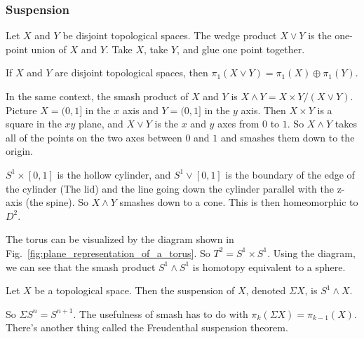 \documentclass[crop=false,class=book,oneside]{standalone}                      %
\begin{document}
            \subsubsection{Suspension}
                Let $X$ and $Y$ be disjoint topological spaces. The wedge
                product $X\vee Y$ is the one-point union of $X$ and $Y$. Take
                $X$, take $Y$, and glue one point together. 
                \begin{theorem}
                    If $X$ and $Y$ are disjoint topological spaces, then
                    $\pi_{1}(X\vee Y)=\pi_{1}(X)\oplus\pi_{1}(Y)$.
                \end{theorem}
                In the same context, the smash product of $X$ and $Y$ is
                $X\wedge Y=X\times Y/(X\vee Y)$. Picture $X=(0,1]$ in the $x$
                axis and $Y=(0,1]$ in the $y$ axis. Then $X\times Y$ is a
                square in the $xy$ plane, and $X\vee Y$ is the $x$ and $y$ axes
                from $0$ to $1$. So $X\wedge Y$ takes all of the points on the
                two axes between $0$ and $1$ and smashes them down to the
                origin.
                \begin{example}
                    $S^{1}\times [0,1]$ is the hollow cylinder, and
                    $S^{1}\vee [0,1]$ is the boundary of the edge of the
                    cylinder (The lid) and the line going down the cylinder
                    parallel with the z-axis (the spine). So $X\wedge Y$
                    smashes down to a cone. This is then homeomorphic
                    to $D^{2}$. 
                \end{example}
                \begin{example}
                    The torus can be visualized by the diagram shown in
                    Fig.~\ref{fig:plane_representation_of_a_torus}.
                    So $T^{2}=S^{1}\times S^{1}$. Using the diagram, we can see
                    that the smash product $S^{1}\wedge S^{1}$ is homotopy
                    equivalent to a sphere.
                \end{example}
                \begin{definition}
                    Let $X$ be a topological space. Then the suspension of $X$,
                    denoted $\Sigma X$, is $S^{1}\wedge X$.
                \end{definition}
                So $\Sigma S^{n}=S^{n+1}$. The usefulness of smash has to do
                with $\pi_{k}(\Sigma X)=\pi_{k-1}(X)$. There's another thing
                called the Freudenthal suspension theorem.
\end{document}
